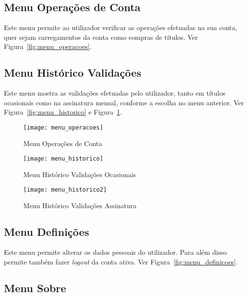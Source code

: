 \subsection{Menu Operações de Conta}

Este menu permite ao utilizador verificar as operações efetuadas na sua conta, quer sejam carregamentos da conta como compras de títulos. Ver Figura~\ref{fig:menu_operacoes}.

\subsection{Menu Histórico Validações}

Este menu mostra as validações efetuadas pelo utilizador, tanto em títulos ocasionais como na assinatura mensal, conforme a escolha no menu anterior. Ver Figura~\ref{fig:menu_historico} e Figura~\ref{fig:menu_historico2}.

\begin{figure}[ht]
\begin{minipage}[b]{0.31\linewidth}
\centering
\texttt{[image: menu\_operacoes]}
    \caption{Menu Operações de Conta}
    \label{fig:menu_operacoes}
\end{minipage}
\hspace{0.25cm}
\begin{minipage}[b]{0.31\linewidth}
\centering
    \texttt{[image: menu\_historico]}
    \caption{Menu Histórico Validações Ocasionais}
    \label{fig:menu_historico}
\end{minipage}
\hspace{0.25cm}
\begin{minipage}[b]{0.31\linewidth}
\centering
    \texttt{[image: menu\_historico2]}
    \caption{Menu Histórico Validações Assinatura}
    \label{fig:menu_historico2}
\end{minipage}
\end{figure}

\subsection{Menu Definições}

Este menu permite alterar os dados pessoais do utilizador. Para além disso permite também fazer \emph{logout} da conta ativa. Ver Figura~\ref{fig:menu_definicoes}.

\subsection{Menu Sobre}

